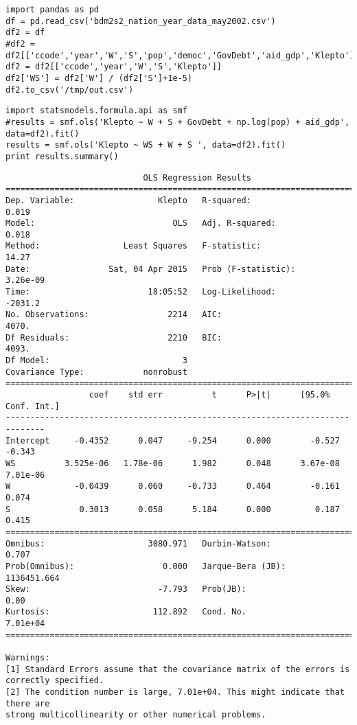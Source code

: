 \documentclass[12pt,fleqn]{article}\usepackage{common}
\begin{document}
\begin{verbatim}
import pandas as pd
df = pd.read_csv('bdm2s2_nation_year_data_may2002.csv')
df2 = df
#df2 = df2[['ccode','year','W','S','pop','democ','GovDebt','aid_gdp','Klepto']]
df2 = df2[['ccode','year','W','S','Klepto']]
df2['WS'] = df2['W'] / (df2['S']+1e-5)
df2.to_csv('/tmp/out.csv')
\end{verbatim}

\begin{verbatim}
import statsmodels.formula.api as smf
#results = smf.ols('Klepto ~ W + S + GovDebt + np.log(pop) + aid_gdp', data=df2).fit()
results = smf.ols('Klepto ~ WS + W + S ', data=df2).fit()
print results.summary()
\end{verbatim}

\begin{verbatim}
                            OLS Regression Results                            
==============================================================================
Dep. Variable:                 Klepto   R-squared:                       0.019
Model:                            OLS   Adj. R-squared:                  0.018
Method:                 Least Squares   F-statistic:                     14.27
Date:                Sat, 04 Apr 2015   Prob (F-statistic):           3.26e-09
Time:                        18:05:52   Log-Likelihood:                -2031.2
No. Observations:                2214   AIC:                             4070.
Df Residuals:                    2210   BIC:                             4093.
Df Model:                           3                                         
Covariance Type:            nonrobust                                         
==============================================================================
                 coef    std err          t      P>|t|      [95.0% Conf. Int.]
------------------------------------------------------------------------------
Intercept     -0.4352      0.047     -9.254      0.000        -0.527    -0.343
WS          3.525e-06   1.78e-06      1.982      0.048      3.67e-08  7.01e-06
W             -0.0439      0.060     -0.733      0.464        -0.161     0.074
S              0.3013      0.058      5.184      0.000         0.187     0.415
==============================================================================
Omnibus:                     3080.971   Durbin-Watson:                   0.707
Prob(Omnibus):                  0.000   Jarque-Bera (JB):          1136451.664
Skew:                          -7.793   Prob(JB):                         0.00
Kurtosis:                     112.892   Cond. No.                     7.01e+04
==============================================================================

Warnings:
[1] Standard Errors assume that the covariance matrix of the errors is correctly specified.
[2] The condition number is large, 7.01e+04. This might indicate that there are
strong multicollinearity or other numerical problems.
\end{verbatim}
\end{document}
